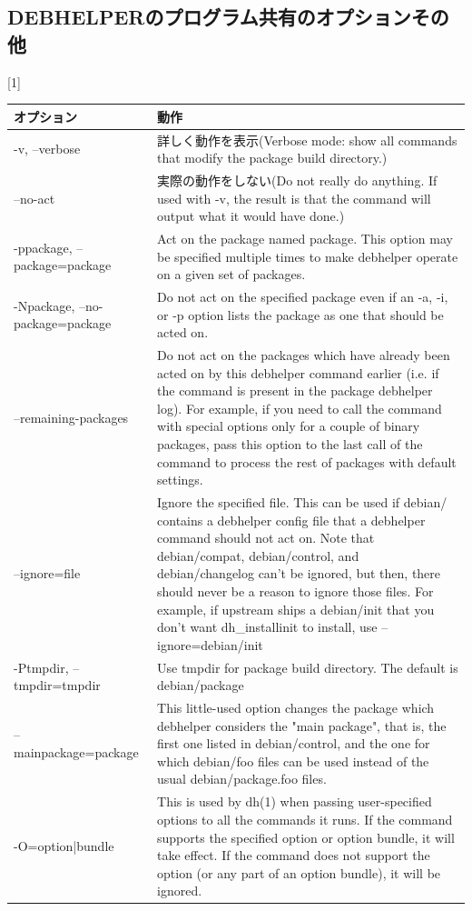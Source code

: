 \documentclass[mingoth,a4paper]{jsarticle}
\begin{document}
\newpage
\subsection{DEBHELPERのプログラム共有のオプションその他}
\begin{table}[htb]
\scalebox{1}[1]{
\begin{tabular}{|l|p{30em}|} \hline
オプション & 動作 \\ \hline
-v, --verbose & 詳しく動作を表示(Verbose mode: show all commands that modify the package build directory.) \\ \hline
--no-act & 実際の動作をしない(Do not really do anything. If used with -v, the result is that the command will output what it would have done.) \\ \hline
-ppackage, --package=package & Act on the package named package. This option may be specified multiple times to make debhelper operate on a given set of packages. \\ \hline
-Npackage, --no-package=package & Do not act on the specified package even if an -a, -i, or -p option lists the package as one that should be acted on.  \\ \hline
--remaining-packages & Do not act on the packages which have already been acted on by this debhelper command earlier (i.e. if the command is present in the package debhelper log).  For
           example, if you need to call the command with special options only for a couple of binary packages, pass this option to the last call of the command to process
           the rest of packages with default settings. \\ \hline
--ignore=file & Ignore the specified file. This can be used if debian/ contains a debhelper config file that a debhelper command should not act on. Note that debian/compat,
           debian/control, and debian/changelog can't be ignored, but then, there should never be a reason to ignore those files.
           For example, if upstream ships a debian/init that you don't want dh\_installinit to install, use --ignore=debian/init  \\ \hline
-Ptmpdir, --tmpdir=tmpdir & Use tmpdir for package build directory. The default is debian/package \\ \hline
--mainpackage=package & This little-used option changes the package which debhelper considers the "main package", that is, the first one listed in debian/control, and the one for which
           debian/foo files can be used instead of the usual debian/package.foo files. \\ \hline
-O=option|bundle & This is used by dh(1) when passing user-specified options to all the commands it runs. If the command supports the specified option or option bundle, it will
           take effect. If the command does not support the option (or any part of an option bundle), it will be ignored.\\ \hline
\end{tabular}
}
\end{table}
\end{document}
